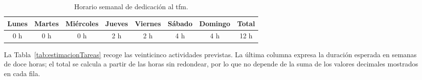 \begin{table}[h!tp]
    \centering
    \begin{adjustbox}{max width=\textwidth}
        \begin{tabular}{|c|c|c|c|c|c|c|c|}
            \hline
            Lunes & Martes & Miércoles & Jueves & Viernes & Sábado & Domingo & Total \\ \hline
            0 h   & 0 h    & 0 h       & 2 h    & 2 h     & 4 h    & 4 h     & 12 h  \\ \hline
        \end{tabular}
    \end{adjustbox}
    \caption{Horario semanal de dedicación al \gls{tfm}.}
    \label{tab:horarioTFM}
\end{table}

La Tabla~\ref{tab:estimacionTareas} recoge las veinticinco actividades previstas. La última columna expresa la duración esperada en semanas de doce horas; el total se calcula a partir de las horas sin redondear, por lo que no depende de la suma de los valores decimales mostrados en cada fila.



